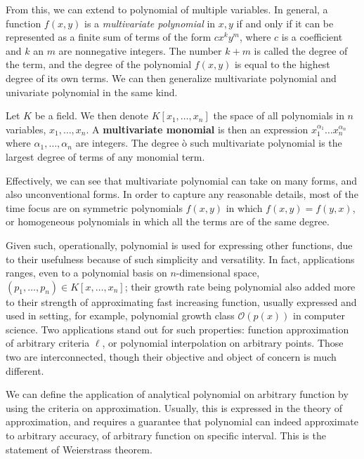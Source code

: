\documentclass[10pt]{article} %
\begin{document}
From this, we can extend to polynomial of multiple variables. In general, a function $f(x,y)$ is a \textit{multivariate polynomial} in $x,y$ if and only if it can be represented as a finite sum of terms of the form $cx^{k}y^{m}$, where $c$ is a coefficient and $k$ an $m$ are nonnegative integers. The number $k+m$ is called the degree of the term, and the degree of the polynomial $f(x,y)$ is equal to the highest degree of its own terms. We can then generalize multivariate polynomial and univariate polynomial in the same kind. 

\begin{definition}
    Let $K$ be a field. We then denote $K[x_{1},\dots,x_{n}]$ the space of all polynomials in $n$ variables, $x_{1},\dots,x_{n}$. A \textbf{multivariate monomial} is then an expression $x_{1}^{\alpha_{1}}\dots x_{n}^{\alpha_{n}}$ where $\alpha_{1},\dots,\alpha_{n}$ are integers. The degree ò such multivariate polynomial is the largest degree of terms of any monomial term.
\end{definition}
Effectively, we can see that multivariate polynomial can take on many forms, and also unconventional forms. In order to capture any reasonable details, most of the time focus are on symmetric polynomials $f(x,y)$ in which $f(x,y)=f(y,x)$, or homogeneous polynomials in which all the terms are of the same degree. 

Given such, operationally, polynomial is used for expressing other functions, due to their usefulness because of such simplicity and versatility. In fact, applications ranges, even to a polynomial basis on $n$-dimensional space, $(p_{1},\dots,p_{n})\in K[x,\dots,x_{n}]$; their growth rate being polynomial also added more to their strength of approximating fast increasing function, usually expressed and used in setting, for example, polynomial growth class $\mathcal{O}(p(x))$ in computer science. Two applications stand out for such properties: function approximation of arbitrary criteria $\ell$, or polynomial interpolation on arbitrary points. Those two are interconnected, though their objective and object of concern is much different. 

We can define the application of analytical polynomial on arbitrary function by using the criteria on approximation. Usually, this is expressed in the theory of approximation, and requires a guarantee that polynomial can indeed approximate to arbitrary accuracy, of arbitrary function on specific interval. This is the statement of Weierstrass theorem. 
\end{document}
